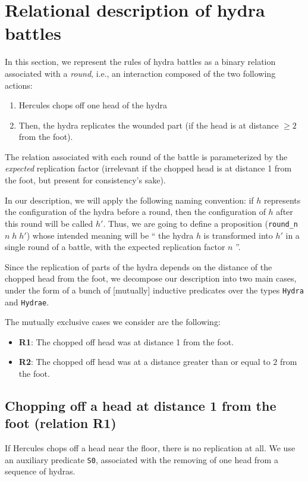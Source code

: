 \section{Relational description of hydra battles}


In this section, we represent the rules of hydra battles as a binary relation associated with
a \emph{round}, i.e., an interaction composed of the two following actions:
\begin{enumerate}
\item Hercules chops off one head of the hydra
\item Then, the  hydra replicates the wounded part (if the head is at distance $\geq 2$ from the foot).
\end{enumerate}
The relation associated with each round of the battle is parameterized  by the \emph{expected} replication  factor (irrelevant if the chopped head is at distance 1 from the foot,
but present for consistency's sake).

In our description,  we will apply the following naming convention: if $h$ represents the configuration of the hydra before a round, then the configuration of $h$ after this round will be called $h'$.
 Thus, we are going to define a proposition  (\texttt{round\_n $n\;h\;h'$})  whose intended meaning will be `` the hydra $h$  is transformed into $h'$  in a single round of a battle, with the expected replication factor $n$ ''.


Since the replication of parts of the hydra depends on the distance of the chopped head from  the foot, we  decompose our description into two main  cases, under the form of a bunch of [mutually] inductive predicates over the types \texttt{Hydra} and \texttt{Hydrae}.

The mutually exclusive cases we consider are the following:
\begin{itemize}
\item \textbf{R1}: The chopped off head was at distance 1 from the foot.
\item \textbf{R2}: The chopped off head was at a distance greater than or equal to  $2$ from the foot.
\end{itemize}



\subsection{Chopping off a head at distance 1 from the foot (relation  R1)}

If Hercules chops off a head near the floor, there is no replication at all. We use an auxiliary 
predicate \texttt{S0}, associated with the removing of one head from a sequence of hydras.


